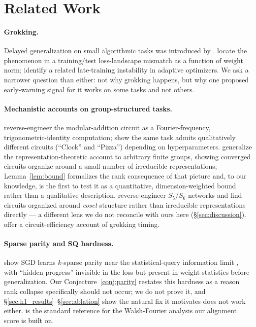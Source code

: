 \documentclass{article}
\begin{document}
\FloatBarrier
\section{Related Work}
\label{sec:related}

\paragraph{Grokking.} Delayed generalization on small algorithmic tasks was
introduced by \citet{power2022grokking}. \citet{liu2023omnigrok} locate the
phenomenon in a training/test loss-landscape mismatch as a function of
weight norm; \citet{thilak2022slingshot} identify a related late-training
instability in adaptive optimizers. We ask a narrower question than either:
not why grokking happens, but why one proposed early-warning signal for it
works on some tasks and not others.

\paragraph{Mechanistic accounts on group-structured tasks.}
\citet{nanda2023progress} reverse-engineer the modular-addition circuit as a
Fourier-frequency, trigonometric-identity computation; \citet{zhong2023clock}
show the same task admits qualitatively different circuits (``Clock'' and
``Pizza'') depending on hyperparameters. \citet{chughtai2023toy} generalize
the representation-theoretic account to arbitrary finite groups, showing
converged circuits organize around a small number of irreducible
representations; Lemma~\ref{lem:bound} formalizes the rank consequence of
that picture and, to our knowledge, is the first to test it as a
quantitative, dimension-weighted bound rather than a qualitative
description. \citet{stander2024grokking} reverse-engineer $S_5$/$S_6$
networks and find circuits organized around \emph{coset} structure rather
than irreducible representations directly --- a different lens we do not
reconcile with ours here (\S\ref{sec:discussion}). \citet{varma2023explaining}
offer a circuit-efficiency account of grokking timing.

\paragraph{Sparse parity and SQ hardness.} \citet{barak2022hidden} show SGD
learns $k$-sparse parity near the statistical-query information limit
\citep{kearns1998efficient}, with ``hidden progress'' invisible in the loss
but present in weight statistics before generalization. Our
Conjecture~\ref{conj:parity} restates this hardness as a reason rank
collapse specifically should not occur; we do not prove it, and
\S\ref{sec:h1_results}--\S\ref{sec:ablation} show the natural fix it
motivates does not work either. \citet{odonnell2014analysis} is the
standard reference for the Walsh-Fourier analysis our alignment score is
built on.
\end{document}
